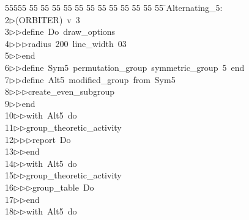 %
%
\begin{tabbing}
55555 \= 55 \= 55 \= 55 \= 55 \= 55 \= 55 \= 55 \= 55 \= 55 \= 55 \= 55 \= 55 \= \>Alternating\_5:\\[0pt]
2\>$\triangleright$\>(ORBITER)\ v\ 3\ \\[0pt]
3\>$\triangleright$\>$\triangleright$\>define\ Do\ draw\_options\ \\[0pt]
4\>$\triangleright$\>$\triangleright$\>$\triangleright$\>radius\ 200\ line\_width\ 03\ \\[0pt]
5\>$\triangleright$\>$\triangleright$\>end\ \\[0pt]
6\>$\triangleright$\>$\triangleright$\>define\ Sym5\ permutation\_group\ symmetric\_group\ 5\ end\ \\[0pt]
7\>$\triangleright$\>$\triangleright$\>define\ Alt5\ modified\_group\ from\ Sym5\ \\[0pt]
8\>$\triangleright$\>$\triangleright$\>$\triangleright$\>create\_even\_subgroup\ \\[0pt]
9\>$\triangleright$\>$\triangleright$\>end\ \\[0pt]
10\>$\triangleright$\>$\triangleright$\>with\ Alt5\ do\ \\[0pt]
11\>$\triangleright$\>$\triangleright$\>group\_theoretic\_activity\ \\[0pt]
12\>$\triangleright$\>$\triangleright$\>$\triangleright$\>report\ Do\ \\[0pt]
13\>$\triangleright$\>$\triangleright$\>end\ \\[0pt]
14\>$\triangleright$\>$\triangleright$\>with\ Alt5\ do\ \\[0pt]
15\>$\triangleright$\>$\triangleright$\>group\_theoretic\_activity\ \\[0pt]
16\>$\triangleright$\>$\triangleright$\>$\triangleright$\>group\_table\ Do\ \\[0pt]
17\>$\triangleright$\>$\triangleright$\>end\ \\[0pt]
18\>$\triangleright$\>$\triangleright$\>with\ Alt5\ do\ \\[0pt]

\end{tabbing}
